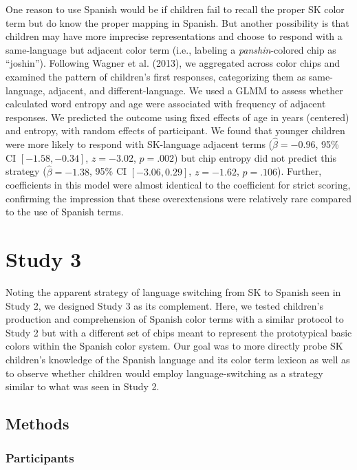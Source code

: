 \documentclass[
  english,
  ,apa7,floatsintext]{apa6}
\begin{document}
One reason to use Spanish would be if children fail to recall the proper SK color term but do know the proper mapping in Spanish. But another possibility is that children may have more imprecise representations and choose to respond with a same-language but adjacent color term (i.e., labeling a \emph{panshin}-colored chip as ``joshin''). Following Wagner et al. (2013), we aggregated across color chips and examined the pattern of children's first responses, categorizing them as same-language, adjacent, and different-language. We used a GLMM to assess whether calculated word entropy and age were associated with frequency of adjacent responses. We predicted the outcome using fixed effects of age in years (centered) and entropy, with random effects of participant. We found that younger children were more likely to respond with SK-language adjacent terms (\(\hat{\beta} = -0.96\), 95\% CI \([-1.58, -0.34]\), \(z = -3.02\), \(p = .002\)) but chip entropy did not predict this strategy (\(\hat{\beta} = -1.38\), 95\% CI \([-3.06, 0.29]\), \(z = -1.62\), \(p = .106\)). Further, coefficients in this model were almost identical to the coefficient for strict scoring, confirming the impression that these overextensions were relatively rare compared to the use of Spanish terms.

\hypertarget{study-3}{%
\section{Study 3}\label{study-3}}

Noting the apparent strategy of language switching from SK to Spanish seen in Study 2, we designed Study 3 as its complement. Here, we tested children's production and comprehension of Spanish color terms with a similar protocol to Study 2 but with a different set of chips meant to represent the prototypical basic colors within the Spanish color system. Our goal was to more directly probe SK children's knowledge of the Spanish language and its color term lexicon as well as to observe whether children would employ language-switching as a strategy similar to what was seen in Study 2.

\hypertarget{methods-2}{%
\subsection{Methods}\label{methods-2}}

\hypertarget{participants-2}{%
\subsubsection{Participants}\label{participants-2}}
\end{document}
